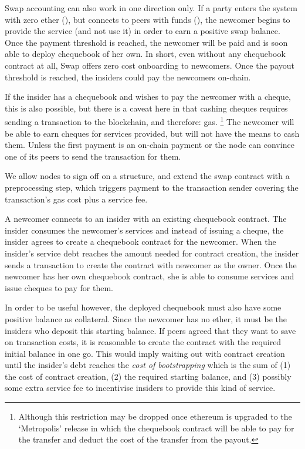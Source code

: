 Swap accounting can also work in one direction only. If a party enters the system with zero ether (), but connects to peers with funds (), the newcomer begins to provide the service (and not use it) in order to earn a positive swap balance. Once the payment threshold is reached, the newcomer will be paid and is soon able to deploy chequebook of her own.
In short, even without any chequebook contract at all, Swap offers zero cost onboarding to newcomers. Once the payout threshold is reached, the insiders could pay the newcomers on-chain. 

If the insider has a chequebook and wishes to pay the newcomer with a cheque, this is also possible, but there is a caveat here in that cashing cheques requires sending a transaction to the blockchain, and therefore: gas.%
%
\footnote{Although this restriction may be dropped once ethereum is upgraded to the `Metropolis' release in which the chequebook contract will be able to pay for the transfer and deduct the cost of the transfer from the payout.}
%
The newcomer will be able to earn cheques for services provided, but will not have the means to cash them. 
Unless the first payment is an on-chain payment or the node can convince one of its peers to send the transaction for them.


We allow nodes to sign off on a structure, and extend the swap contract with a preprocessing step, which triggers payment to the transaction sender covering the transaction's gas cost plus a service fee. 
  

  
  
A newcomer connects to  an insider with an existing chequebook contract. The insider consumes the newcomer's services and instead of issuing a cheque, the insider agrees to create a chequebook contract for the newcomer. When the insider's service debt reaches the amount needed for contract creation, the insider sends a transaction to create the contract with newcomer as the owner. Once the newcomer has her own chequebook contract, she is able to consume services and issue cheques to pay for them.
 
In order to be useful however, the deployed chequebook must also have some positive balance as collateral. Since the newcomer has no ether, it must be the insiders who deposit this starting balance. If peers agreed that they want to save on transaction costs, it is reasonable to create the contract with the required initial balance in one go. This would imply waiting out with contract creation until the insider's debt reaches the \emph{cost of bootstrapping} which is the sum of (1) the cost of contract creation, (2) the required starting balance, and (3) possibly some extra service fee to incentivise insiders to provide this kind of service.

